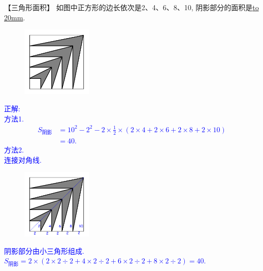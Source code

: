 \item {
    【三角形面积】
    如图中正方形的边长依次是2、4、6、8、10, 阴影部分的面积是\underline{\hbox to 20mm{}}.
    \begin{figure}[H] 
        \centering
        \includegraphics[width=0.3\textwidth]{./pics/Chapter_2/17.png}
    \end{figure}
    \ifshowSolution 
        \fangsong{}\textcolor{blue}{
            正解: \\
            方法1.\\
            \begin{align*}
                S_{阴影} &= 10^2 - 2^2 - 2\times \frac12\times (2\times 4 + 2\times 6 + 2\times 8 + 2\times 10) \\
                &= 40.
            \end{align*}
            方法2.\\
            连接对角线.
            \begin{figure}[H] 
                \centering
                \includegraphics[width=0.3\textwidth]{./pics/Chapter_2/seikai_17.png}
            \end{figure}
            阴影部分由小三角形组成.\\
            $S_{阴影} = 2\times (2\times 2\div 2 + 4\times 2\div 2 + 6\times 2\div 2 + 8\times 2\div 2) = 40.$
        }
    \else
        \vspace{1cm}
    \fi
}

